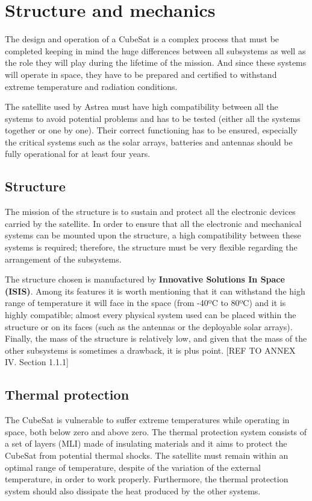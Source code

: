 \section{Structure and mechanics}
The design and operation of a CubeSat is a complex process that must be completed keeping in mind the huge differences between all subsystems as well as the role they will play during the lifetime of the mission. And since these systems will operate in space, they have to be prepared and certified to withstand extreme temperature and radiation conditions.

The satellite used by Astrea must have high compatibility between all the systems to avoid potential problems and has to be tested (either all the systems together or one by one). Their correct functioning has to be ensured, especially the critical systems such as the solar arrays, batteries and antennas should be fully operational for at least four years.

\subsection{Structure}
The mission of the structure is to sustain and protect all the electronic devices carried by the satellite. In order to ensure that all the electronic and mechanical systems can be mounted upon the structure, a high compatibility between these systems is required; therefore, the structure must be very flexible regarding the arrangement of the subsystems.

The structure chosen is manufactured by \textbf{Innovative Solutions In Space (ISIS)}. Among its features it is worth mentioning that it can withstand the high range of temperature it will face in the space (from -40ºC to 80ºC) and it is highly compatible; almost every physical system  used can be placed within the structure or on its faces (such as the antennas or the deployable solar arrays). Finally, the mass of the structure is relatively low, and given that the mass of the other subsystems is sometimes a drawback, it is plus point. [{REF TO ANNEX IV. Section 1.1.1}]

\subsection{Thermal protection}
The CubeSat is vulnerable to suffer extreme temperatures while operating in space, both below zero and above zero. The thermal protection system consists of a set of layers (MLI) made of insulating materials and it aims to protect the CubeSat from potential thermal shocks. The satellite must remain within an optimal range of temperature, despite of the variation of the external temperature, in order to work properly. Furthermore, the thermal protection system should also dissipate the heat produced by the other systems.

